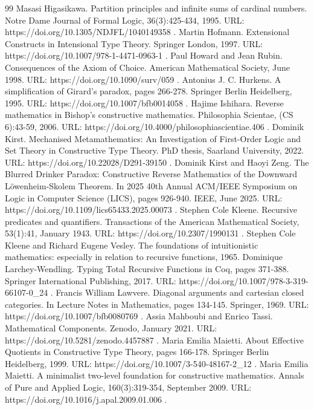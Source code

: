 \begin{thebibliography}{99}
 Masasi Higasikawa. Partition principles and infinite sums of cardinal numbers. Notre Dame Journal of Formal Logic, 36(3):425-434, 1995. URL: https://doi.org/10.1305/NDJFL/1040149358 .
 Martin Hofmann. Extensional Constructs in Intensional Type Theory. Springer London, 1997. URL: https://doi.org/10.1007/978-1-4471-0963-1 .
 Paul Howard and Jean Rubin. Consequences of the Axiom of Choice. American Mathematical Society, June 1998. URL: https://doi.org/10.1090/surv/059 .
 Antonius J. C. Hurkens. A simplification of Girard’s paradox, pages 266-278. Springer Berlin Heidelberg, 1995. URL: https://doi.org/10.1007/bfb0014058 .
 Hajime Ishihara. Reverse mathematics in Bishop’s constructive mathematics. Philosophia Scientae, (CS 6):43-59, 2006. URL: https://doi.org/10.4000/philosophiascientiae.406 .
 Dominik Kirst. Mechanised Metamathematics: An Investigation of First-Order Logic and Set Theory in Constructive Type Theory. PhD thesis, Saarland University, 2022. URL: https://doi.org/10.22028/D291-39150 .
 Dominik Kirst and Haoyi Zeng. The Blurred Drinker Paradox: Constructive Reverse Mathematics of the Downward Löwenheim-Skolem Theorem. In 2025 40th Annual ACM/IEEE Symposium on Logic in Computer Science (LICS), pages 926-940. IEEE, June 2025. URL: https://doi.org/10.1109/lics65433.2025.00073 .
 Stephen Cole Kleene. Recursive predicates and quantifiers. Transactions of the American Mathematical Society, 53(1):41, January 1943. URL: https://doi.org/10.2307/1990131 .
 Stephen Cole Kleene and Richard Eugene Vesley. The foundations of intuitionistic mathematics: especially in relation to recursive functions, 1965.
 Dominique Larchey-Wendling. Typing Total Recursive Functions in Coq, pages 371-388. Springer International Publishing, 2017. URL: https://doi.org/10.1007/978-3-319-66107-0\_24 .
 Francis William Lawvere. Diagonal arguments and cartesian closed categories. In Lecture Notes in Mathematics, pages 134-145. Springer, 1969. URL: https://doi.org/10.1007/bfb0080769 .
 Assia Mahboubi and Enrico Tassi. Mathematical Components. Zenodo, January 2021. URL: https://doi.org/10.5281/zenodo.4457887 .
 Maria Emilia Maietti. About Effective Quotients in Constructive Type Theory, pages 166-178. Springer Berlin Heidelberg, 1999. URL: https://doi.org/10.1007/3-540-48167-2\_12 .
 Maria Emilia Maietti. A minimalist two-level foundation for constructive mathematics. Annals of Pure and Applied Logic, 160(3):319-354, September 2009. URL: https://doi.org/10.1016/j.apal.2009.01.006 .

\end{thebibliography}
